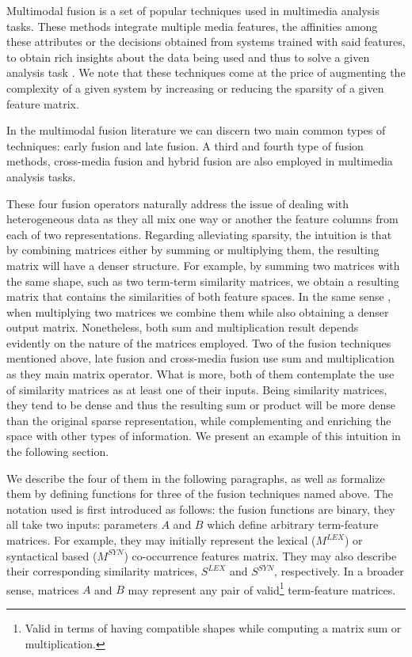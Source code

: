 Multimodal fusion is a set of popular techniques used in multimedia analysis tasks. These methods integrate multiple media features, the affinities among these attributes or the decisions obtained from systems trained with said features, to obtain rich insights about the data being used and thus to solve a given analysis  task \cite{AtreyHEK10}. We note that these techniques come at the price of augmenting the complexity of a given system by increasing or reducing the sparsity of a given feature matrix.


In the multimodal fusion literature we can discern two main common types of techniques: early fusion and late fusion. A third and fourth type of fusion methods, cross-media fusion and hybrid fusion are also employed in multimedia analysis tasks. 

These four fusion operators naturally address the issue of dealing with heterogeneous data as they all mix one way or another the feature columns from each of two representations. Regarding alleviating sparsity, the intuition is that by combining matrices either by summing or multiplying them, the resulting matrix will have a denser structure. For example, by summing two matrices with the same shape, such as two term-term similarity matrices, we  obtain a resulting matrix that contains the similarities of both feature spaces. In the same sense , when multiplying two matrices we combine them while also obtaining a denser output matrix. Nonetheless, both sum and multiplication result depends evidently on the nature of the matrices employed. Two of the fusion techniques mentioned above, late fusion and cross-media fusion use sum and multiplication as they  main matrix operator. What is more, both of them contemplate the use of similarity matrices as at least one of their inputs. Being similarity matrices, they tend to be dense and thus the resulting sum or product will be more dense than the original sparse representation, while complementing and enriching the space with other types of information. We present an example of this intuition in the following section.


We describe the four of them in the following paragraphs, as well as formalize them by defining functions for three of the fusion techniques named above.
The notation used is first introduced as follows: the fusion functions are binary, they all take two inputs: parameters $A$ and $B$ which define arbitrary term-feature matrices. For example, they may initially represent the lexical ($M^{LEX}$) or syntactical based ($M^{SYN}$) co-occurrence features matrix. They may also describe their  corresponding similarity matrices, $S^{LEX}$ and  $S^{SYN}$, respectively. In a broader sense, matrices $A$ and $B$ may represent any pair of valid\footnote{Valid in terms of having compatible shapes while computing a matrix sum or multiplication.} term-feature matrices.



